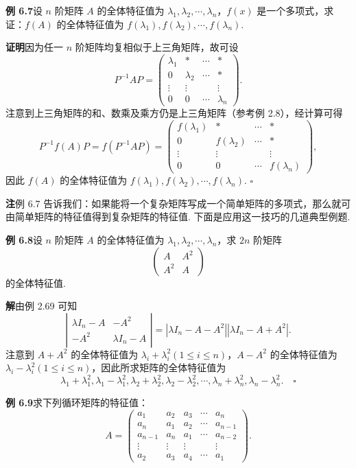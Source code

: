 \documentclass[UTF8,12pt,a4paper,fontset=fandol]{ctexart}
\begin{document}
\noindent\textbf{例 6.7}\quad 设 $n$ 阶矩阵 $A$ 的全体特征值为 $\lambda_1,\lambda_2,\cdots,\lambda_n$，$f(x)$ 是一个多项式，求证：$f(A)$ 的全体特征值为 $f(\lambda_1),f(\lambda_2),\cdots,f(\lambda_n)$.

\noindent\textbf{证明}\quad 因为任一 $n$ 阶矩阵均复相似于上三角矩阵，故可设
\[
P^{-1}AP=\left(\begin{array}{cccc}
\lambda_1 & * & \cdots & *\\
0 & \lambda_2 & \cdots & *\\
\vdots & \vdots & & \vdots\\
0 & 0 & \cdots & \lambda_n
\end{array}\right).
\]
注意到上三角矩阵的和、数乘及乘方仍是上三角矩阵（参考例 2.8），经计算可得
\[
P^{-1}f(A)P=f(P^{-1}AP)=\left(\begin{array}{cccc}
f(\lambda_1) & * & \cdots & *\\
0 & f(\lambda_2) & \cdots & *\\
\vdots & \vdots & & \vdots\\
0 & 0 & \cdots & f(\lambda_n)
\end{array}\right),
\]
因此 $f(A)$ 的全体特征值为 $f(\lambda_1),f(\lambda_2),\cdots,f(\lambda_n)$. $\square$

\noindent\textbf{注}\quad 例 6.7 告诉我们：如果能将一个复杂矩阵写成一个简单矩阵的多项式，那么就可由简单矩阵的特征值得到复杂矩阵的特征值. 下面是应用这一技巧的几道典型例题.

\noindent\textbf{例 6.8}\quad 设 $n$ 阶矩阵 $A$ 的全体特征值为 $\lambda_1,\lambda_2,\cdots,\lambda_n$，求 $2n$ 阶矩阵
\[
\left(\begin{array}{cc}
A & A^2\\
A^2 & A
\end{array}\right)
\]
的全体特征值.

\noindent\textbf{解}\quad 由例 2.69 可知
\[
\left|\begin{array}{cc}
\lambda I_n-A & -A^2\\
-A^2 & \lambda I_n-A
\end{array}\right|
=|\lambda I_n-A-A^2||\lambda I_n-A+A^2|.
\]
注意到 $A+A^2$ 的全体特征值为 $\lambda_i+\lambda_i^2(1\le i\le n)$，$A-A^2$ 的全体特征值为 $\lambda_i-\lambda_i^2(1\le i\le n)$，因此所求矩阵的全体特征值为
\[
\lambda_1+\lambda_1^2,\lambda_1-\lambda_1^2,\lambda_2+\lambda_2^2,\lambda_2-\lambda_2^2,\cdots,\lambda_n+\lambda_n^2,\lambda_n-\lambda_n^2. \quad \square
\]

\noindent\textbf{例 6.9}\quad 求下列循环矩阵的特征值：
\[
A=\left(\begin{array}{ccccc}
a_1 & a_2 & a_3 & \cdots & a_n\\
a_n & a_1 & a_2 & \cdots & a_{n-1}\\
a_{n-1} & a_n & a_1 & \cdots & a_{n-2}\\
\vdots & \vdots & \vdots & & \vdots\\
a_2 & a_3 & a_4 & \cdots & a_1
\end{array}\right).
\]
\end{document}
